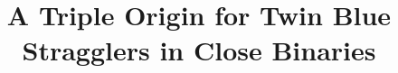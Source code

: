 \documentclass{aastex62}
\begin{document}
\title{A Triple Origin for Twin Blue Stragglers in Close Binaries}


\end{document}
